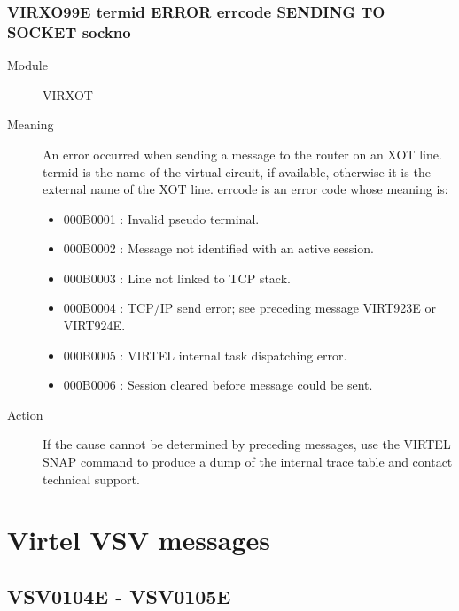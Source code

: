 \documentclass[letterpaper,10pt,english]{sphinxmanual}
\begin{document}
\subsubsection{VIRXO99E termid ERROR errcode SENDING TO SOCKET sockno}
\label{\detokenize{messages:virxo99e-termid-error-errcode-sending-to-socket-sockno}}\begin{description}
\item[{Module}] \leavevmode
VIRXOT

\item[{Meaning}] \leavevmode
An error occurred when sending a message to the router on an XOT line. termid is the name of the virtual circuit, if available, otherwise it is the external name of the XOT line. errcode is an error code whose meaning is:
\begin{itemize}
\item {} 
000B0001 : Invalid pseudo terminal.

\item {} 
000B0002 : Message not identified with an active session.

\item {} 
000B0003 : Line not linked to TCP stack.

\item {} 
000B0004 : TCP/IP send error; see preceding message VIRT923E or VIRT924E.

\item {} 
000B0005 : VIRTEL internal task dispatching error.

\item {} 
000B0006 : Session cleared before message could be sent.

\end{itemize}

\item[{Action}] \leavevmode
If the cause cannot be determined by preceding messages, use the VIRTEL SNAP command to produce a dump of the internal trace table and contact technical support.

\end{description}


\section{Virtel VSV messages}
\label{\detokenize{messages:virtel-vsv-messages}}

\subsection{VSV0104E - VSV0105E}
\label{\detokenize{messages:vsv0104e-vsv0105e}}
\end{document}
